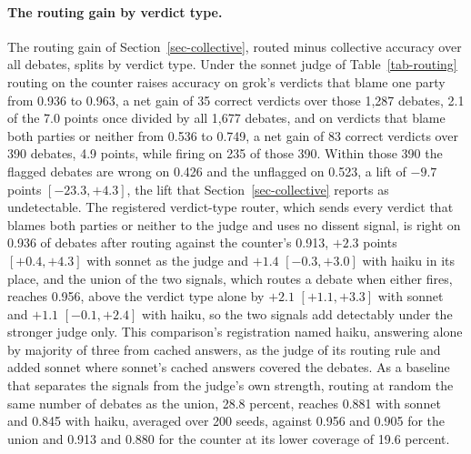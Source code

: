 \paragraph{The routing gain by verdict type.}
The routing gain of Section~\ref{sec-collective}, routed minus collective
accuracy over all debates, splits by verdict type. Under the sonnet judge of
Table~\ref{tab-routing} routing on the counter raises accuracy on grok's verdicts that
blame one party from 0.936 to 0.963, a net gain of 35 correct verdicts over
those 1,287 debates, 2.1 of the 7.0 points once divided by all 1,677
debates, and on verdicts that blame both parties or neither from 0.536 to
0.749, a net gain of 83 correct verdicts over 390 debates, 4.9 points, while
firing on 235 of those 390. Within those 390 the flagged debates are wrong on
0.426 and the unflagged on 0.523, a lift of $-9.7$ points $[-23.3, +4.3]$,
the lift that Section~\ref{sec-collective} reports as undetectable.
The registered verdict-type router, which sends every verdict that blames
both parties or neither to the judge and uses no dissent signal, is right on
0.936 of debates after routing against the counter's 0.913, $+2.3$ points
$[+0.4, +4.3]$ with sonnet as the judge and $+1.4$ $[-0.3, +3.0]$ with haiku
in its place, and the union of the two signals,
which routes a debate when either fires, reaches 0.956, above the verdict
type alone by $+2.1$ $[+1.1, +3.3]$ with sonnet and $+1.1$ $[-0.1, +2.4]$
with haiku, so the two signals add detectably under the stronger judge only.
This comparison's registration named haiku, answering alone by majority of
three from cached answers, as the judge of its routing rule and added sonnet
where sonnet's cached answers covered the debates.
As a baseline that separates the signals from the judge's own strength,
routing at random the same number of debates as the union, 28.8 percent,
reaches 0.881 with sonnet and 0.845 with haiku, averaged over 200 seeds,
against 0.956 and 0.905 for the union and 0.913 and 0.880 for the counter at
its lower coverage of 19.6 percent.

